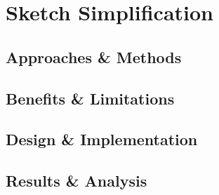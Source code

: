 \chapter{Sketch Simplification}
\label{chapterlabel4}
\section{Approaches \& Methods}
\section{Benefits \& Limitations}
\section{Design \& Implementation}
\section{Results \& Analysis}
